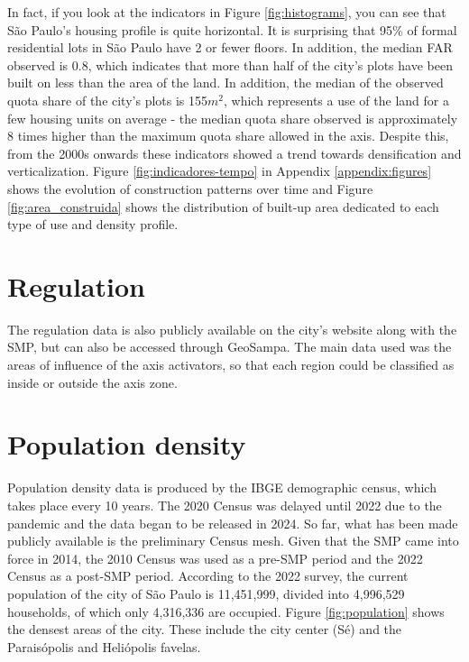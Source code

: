 In fact, if you look at the indicators in Figure \ref{fig:histograms}, you can see that São Paulo's housing profile is quite horizontal. It is surprising that 95\% of formal residential lots in São Paulo have 2 or fewer floors. In addition, the median FAR observed is 0.8, which indicates that more than half of the city's plots have been built on less than the area of the land. In addition, the median of the observed quota share of the city's plots is 155$m^2$, which represents a use of the land for a few housing units on average - the median quota share observed is approximately 8 times higher than the maximum quota share allowed in the axis. Despite this, from the 2000s onwards these indicators showed a trend towards densification and verticalization. Figure \ref{fig:indicadores-tempo} in Appendix \ref{appendix:figures} shows the evolution of construction patterns over time and Figure \ref{fig:area_construida} shows the distribution of built-up area dedicated to each type of use and density profile.

\section{Regulation}
\label{sec:dataSMP}

The regulation data is also publicly available on the city's website along with the SMP, but can also be accessed through GeoSampa. The main data used was the areas of influence of the axis activators, so that each region could be classified as inside or outside the axis zone.

\section{Population density}
\label{sec:dataCensus}

Population density data is produced by the IBGE demographic census, which takes place every 10 years. The 2020 Census was delayed until 2022 due to the pandemic and the data began to be released in 2024. So far, what has been made publicly available is the preliminary Census mesh. Given that the SMP came into force in 2014, the 2010 Census was used as a pre-SMP period and the 2022 Census as a post-SMP period. According to the 2022 survey, the current population of the city of São Paulo is 11,451,999, divided into 4,996,529 households, of which only 4,316,336 are occupied. Figure \ref{fig:population} shows the densest areas of the city. These include the city center (Sé) and the Paraisópolis and Heliópolis favelas.

